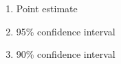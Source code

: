\begin{enumerate}
	\item Point estimate
	\item 95\% confidence interval
	\item 90\% confidence interval
\end{enumerate}
